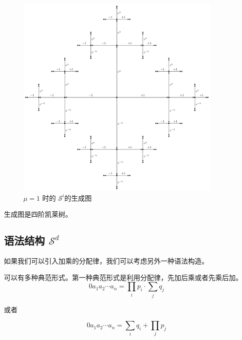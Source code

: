 \documentclass[a4paper,12pt]{article}
\numberwithin{definition}{section}
\numberwithin{lemma}{section}
\numberwithin{proposition}{section}
\numberwithin{theorem}{section}
\numberwithin{grammar}{section}
\numberwithin{program}{section}
\numberwithin{convention}{section}
\numberwithin{corollary}{section}
\begin{document}
\begin{figure}[ht]
\centering
\includegraphics[width=4in]{images/cayley_i}
\caption{$\mu=1$ 时的 $\mathcal{S}^i$的生成图}
\end{figure}

生成图是四阶凯莱树。

\subsection{语法结构 $\mathcal{S}^d$}\label{subsec:syntactical}

如果我们可以引入加乘的分配律，我们可以考虑另外一种语法构造。

可以有多种典范形式。第一种典范形式是利用分配律，先加后乘或者先乘后加。
$$
0 a_1 a_2 \cdots a_n = \prod_{i} p_i \cdot \sum_{j} q_j
$$

或者

$$
0 a_1 a_2 \cdots a_n = \sum_{i} q_i + \prod_{j} p_j
$$
\end{document}
